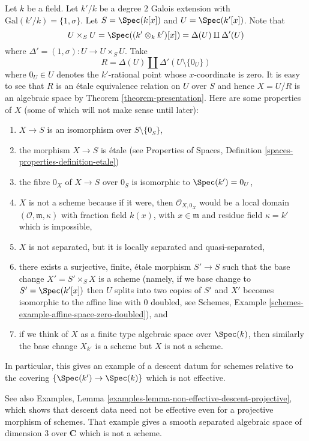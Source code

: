 \begin{example}
\label{example-non-representable-descent}
Let $k$ be a field. Let $k'/k$ be a degree $2$ Galois extension
with $\text{Gal}(k'/k) = \{1, \sigma\}$. Let $S = \Spec(k[x])$
and $U = \Spec(k'[x])$. Note that
$$
U \times_S U =
\Spec((k' \otimes_k k')[x]) =
\Delta(U) \amalg \Delta'(U)
$$
where $\Delta' = (1, \sigma) : U \to U \times_S U$. Take
$$
R = \Delta(U) \amalg \Delta'(U \setminus \{0_U\})
$$
where $0_U \in U$ denotes the $k'$-rational point whose $x$-coordinate is zero.
It is easy to see that $R$ is an \'etale equivalence relation on $U$ over $S$
and hence $X = U/R$ is an algebraic space by
Theorem \ref{theorem-presentation}. Here are some properties of $X$ (some
of which will not make sense until later):
\begin{enumerate}
\item $X \to S$ is an isomorphism over $S \setminus \{0_S\}$,
\item the morphism $X \to S$ is \'etale (see
Properties of Spaces,
Definition \ref{spaces-properties-definition-etale})
\item the fibre $0_X$ of $X \to S$ over $0_S$ is isomorphic to
$\Spec(k') = 0_U$,
\item $X$ is not a scheme because if it were, then $\mathcal{O}_{X, 0_X}$
would be a local domain $(\mathcal{O}, \mathfrak m, \kappa)$ with
fraction field $k(x)$, with $x \in \mathfrak m$ and residue field
$\kappa = k'$ which is impossible,
\item $X$ is not separated, but it is
locally separated and quasi-separated,
\item there exists a surjective, finite, \'etale morphism $S' \to S$
such that the base change $X' = S' \times_S X$ is a scheme (namely, if
we base change to $S' = \Spec(k'[x])$ then $U$ splits into
two copies of $S'$ and $X'$ becomes isomorphic to the affine line with
$0$ doubled, see
Schemes, Example \ref{schemes-example-affine-space-zero-doubled}), and
\item if we think of $X$ as a finite type algebraic space over
$\Spec(k)$, then similarly the base change $X_{k'}$ is a scheme
but $X$ is not a scheme.
\end{enumerate}
In particular, this gives an example of a descent datum for schemes
relative to the covering $\{\Spec(k') \to \Spec(k)\}$
which is not effective.
\end{example}

\noindent
See also Examples, 
Lemma \ref{examples-lemma-non-effective-descent-projective},
which shows that descent data need not be effective
even for a projective morphism of schemes. That example
gives a smooth separated algebraic space of dimension 3
over ${\mathbf C}$ which is not a scheme.

